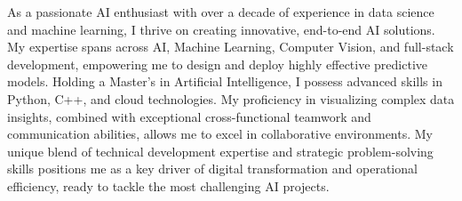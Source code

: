 %
%
%
\par{
As a passionate AI enthusiast with over a decade of experience in data science and machine learning, I thrive on creating innovative, end-to-end AI solutions. My expertise spans across AI, Machine Learning, Computer Vision, and full-stack development, empowering me to design and deploy highly effective predictive models. Holding a Master’s in Artificial Intelligence, I possess advanced skills in Python, C++, and cloud technologies. My proficiency in visualizing complex data insights, combined with exceptional cross-functional teamwork and communication abilities, allows me to excel in collaborative environments. My unique blend of technical development expertise and strategic problem-solving skills positions me as a key driver of digital transformation and operational efficiency, ready to tackle the most challenging AI projects.

}
\vspace{6.6mm}

